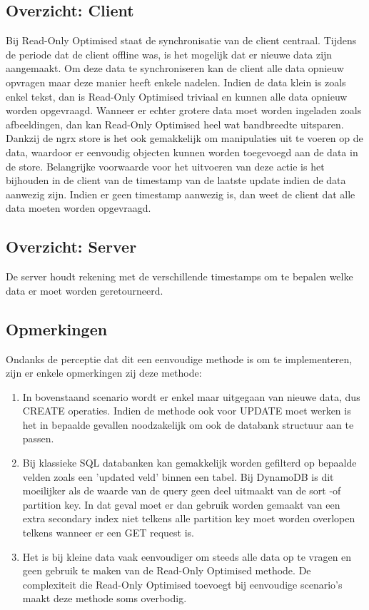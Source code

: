 \subsection{Overzicht: Client}
Bij Read-Only Optimised staat de synchronisatie van de client centraal. Tijdens de periode dat de client offline was, is het mogelijk dat er nieuwe data zijn aangemaakt. Om deze data te synchroniseren kan de client alle data opnieuw opvragen maar deze manier heeft enkele nadelen. Indien de data klein is zoals enkel tekst, dan is Read-Only Optimised triviaal en kunnen alle data opnieuw worden opgevraagd. Wanneer er echter grotere data moet worden ingeladen zoals afbeeldingen, dan kan Read-Only Optimised heel wat bandbreedte uitsparen. Dankzij de ngrx store is het ook gemakkelijk om manipulaties uit te voeren op de data, waardoor er eenvoudig objecten kunnen worden toegevoegd aan de data in de store. Belangrijke voorwaarde voor het uitvoeren van deze actie is het bijhouden in de client van de timestamp van de laatste update indien de data aanwezig zijn. Indien er geen timestamp aanwezig is, dan weet de client dat alle data moeten worden opgevraagd.
\subsection{Overzicht: Server}
De server houdt rekening met de verschillende timestamps om te bepalen welke data er moet worden geretourneerd.

\subsection{Opmerkingen}
Ondanks de perceptie dat dit een eenvoudige methode is om te implementeren, zijn er enkele opmerkingen zij deze methode:
\begin{enumerate}
\item In bovenstaand scenario wordt er enkel maar uitgegaan van nieuwe data, dus CREATE operaties. Indien de methode ook voor UPDATE moet werken is het in bepaalde gevallen noodzakelijk om ook de databank structuur aan te passen.
\item Bij klassieke SQL databanken kan gemakkelijk worden gefilterd op bepaalde velden zoals een 'updated veld' binnen een tabel. Bij DynamoDB is dit moeilijker als de waarde van de query geen deel uitmaakt van de sort -of partition key. In dat geval moet er dan gebruik worden gemaakt van een extra secondary index niet telkens alle partition key moet worden overlopen telkens wanneer er een GET request is.
\item Het is bij kleine data vaak eenvoudiger om steeds alle data op te vragen en geen gebruik te maken van de Read-Only Optimised methode. De complexiteit die Read-Only Optimised toevoegt bij eenvoudige scenario's maakt deze methode soms overbodig.
\end{enumerate}
